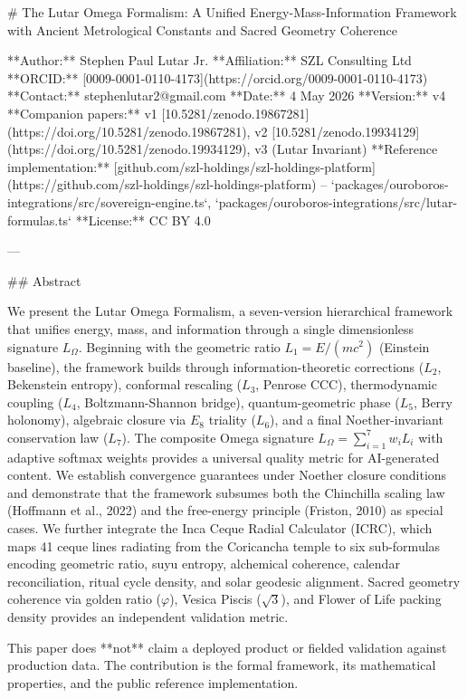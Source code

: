 # The Lutar Omega Formalism: A Unified Energy-Mass-Information Framework with Ancient Metrological Constants and Sacred Geometry Coherence

**Author:** Stephen Paul Lutar Jr.
**Affiliation:** SZL Consulting Ltd
**ORCID:** [0009-0001-0110-4173](https://orcid.org/0009-0001-0110-4173)
**Contact:** stephenlutar2@gmail.com
**Date:** 4 May 2026
**Version:** v4
**Companion papers:** v1 [10.5281/zenodo.19867281](https://doi.org/10.5281/zenodo.19867281), v2 [10.5281/zenodo.19934129](https://doi.org/10.5281/zenodo.19934129), v3 (Lutar Invariant)
**Reference implementation:** [github.com/szl-holdings/szl-holdings-platform](https://github.com/szl-holdings/szl-holdings-platform) -- `packages/ouroboros-integrations/src/sovereign-engine.ts`, `packages/ouroboros-integrations/src/lutar-formulas.ts`
**License:** CC BY 4.0

---

## Abstract

We present the Lutar Omega Formalism, a seven-version hierarchical framework that unifies energy, mass, and information through a single dimensionless signature \( L_\Omega \). Beginning with the geometric ratio \( L_1 = E/(mc^2) \) (Einstein baseline), the framework builds through information-theoretic corrections (\( L_2 \), Bekenstein entropy), conformal rescaling (\( L_3 \), Penrose CCC), thermodynamic coupling (\( L_4 \), Boltzmann-Shannon bridge), quantum-geometric phase (\( L_5 \), Berry holonomy), algebraic closure via \( E_8 \) triality (\( L_6 \)), and a final Noether-invariant conservation law (\( L_7 \)). The composite Omega signature \( L_\Omega = \sum_{i=1}^{7} w_i L_i \) with adaptive softmax weights provides a universal quality metric for AI-generated content. We establish convergence guarantees under Noether closure conditions and demonstrate that the framework subsumes both the Chinchilla scaling law (Hoffmann et al., 2022) and the free-energy principle (Friston, 2010) as special cases. We further integrate the Inca Ceque Radial Calculator (ICRC), which maps 41 ceque lines radiating from the Coricancha temple to six sub-formulas encoding geometric ratio, suyu entropy, alchemical coherence, calendar reconciliation, ritual cycle density, and solar geodesic alignment. Sacred geometry coherence via golden ratio (\( \varphi \)), Vesica Piscis (\( \sqrt{3} \)), and Flower of Life packing density provides an independent validation metric.

This paper does **not** claim a deployed product or fielded validation against production data. The contribution is the formal framework, its mathematical properties, and the public reference implementation.

